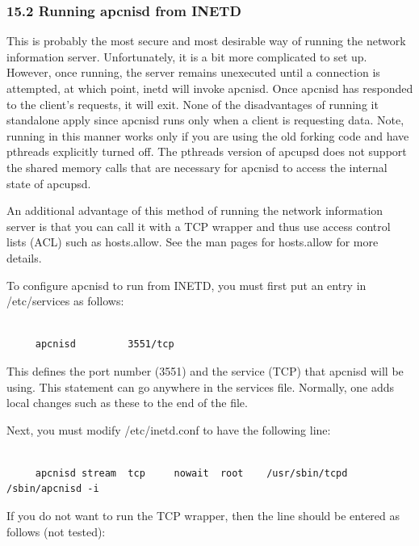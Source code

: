 {{{{{{{{{{\label{Running-apcnisd-from-INETD}

\subsubsection*{15.2 Running apcnisd from INETD}

This is probably the most secure and most desirable way of running the network
information server. Unfortunately, it is a bit more complicated to set up.
However, once running, the server remains unexecuted until a connection is
attempted, at which point, inetd will invoke apcnisd. Once apcnisd has
responded to the client's requests, it will exit. None of the disadvantages of
running it standalone apply since apcnisd runs only when a client is
requesting data. Note, running in this manner works only if you are using the
old forking code and have pthreads explicitly turned off. The pthreads version
of apcupsd does not support the shared memory calls that are necessary for
apcnisd to access the internal state of apcupsd.  

An additional advantage of this method of running the network information
server is that you can call it with a TCP wrapper and thus use access control
lists (ACL) such as hosts.allow. See the man pages for hosts.allow for more
details.  

To configure apcnisd to run from INETD, you must first put an entry in
/etc/services as follows: 

\footnotesize
\begin{verbatim}
     
     apcnisd         3551/tcp
\end{verbatim}
\normalsize

This defines the port number (3551) and the service (TCP) that apcnisd will be
using. This statement can go anywhere in the services file. Normally, one adds
local changes such as these to the end of the file.  

Next, you must modify /etc/inetd.conf to have the following line: 

\footnotesize
\begin{verbatim}
     
     apcnisd stream  tcp     nowait  root    /usr/sbin/tcpd  /sbin/apcnisd -i
\end{verbatim}
\normalsize

If you do not want to run the TCP wrapper, then the line should be entered as
follows (not tested): 

}}}}}}}}}}
